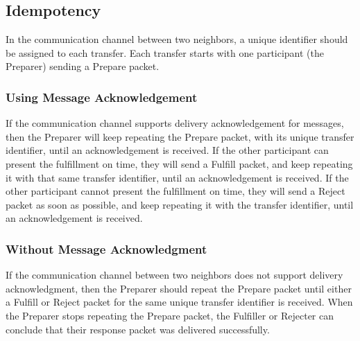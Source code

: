 \documentclass[11pt,twoside,a4paper]{article}
\begin{document}
\subsection{Idempotency}
In the communication channel between two neighbors,
a unique identifier should be assigned to each transfer. Each transfer starts with one participant (the Preparer) sending a Prepare packet.

\subsubsection{Using Message Acknowledgement}
If the communication channel supports delivery acknowledgement for messages, then the Preparer will keep repeating the Prepare packet, with its unique transfer identifier,
until an acknowledgement is received.
If the other participant can present the fulfillment on time, they will send a Fulfill packet, and keep repeating it with that same transfer identifier, until an acknowledgement is received.
If the other participant cannot present the fulfillment on time, they will send a Reject packet as soon as possible, and keep repeating it with the transfer identifier,
until an acknowledgement is received.

\subsubsection{Without Message Acknowledgment}
If the communication channel between two neighbors does not support delivery acknowledgment, then the Preparer should repeat the Prepare packet until either a Fulfill or Reject
packet for the same unique transfer identifier is received. When the Preparer stops repeating the Prepare packet, the Fulfiller or Rejecter can conclude that their response packet
was delivered successfully.



\end{document}

